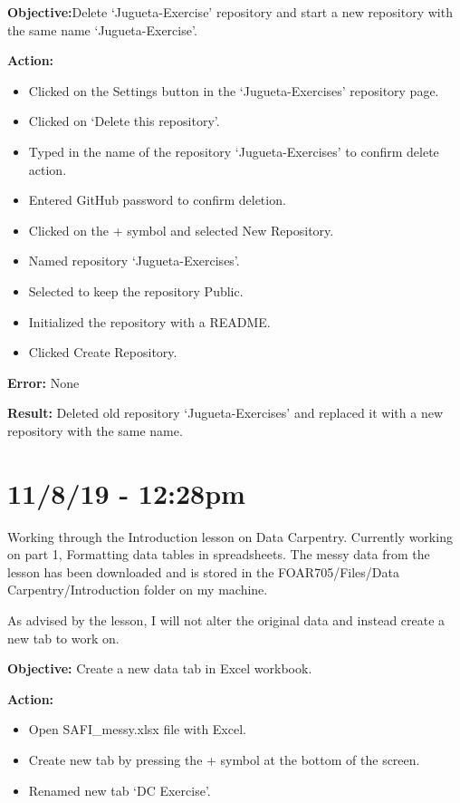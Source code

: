 \documentclass{article}
\begin{document}
\textbf{Objective:}Delete ‘Jugueta-Exercise’ repository and start a new repository with the same name ‘Jugueta-Exercise’.

\textbf{Action:}
\begin{itemize}
    \item Clicked on the Settings button in the ‘Jugueta-Exercises’ repository page. 
    \item Clicked on ‘Delete this repository’. 
    \item Typed in the name of the repository ‘Jugueta-Exercises’ to confirm delete action. 
    \item Entered GitHub password to confirm deletion.
    \item Clicked on the + symbol and selected New Repository.
    \item Named repository ‘Jugueta-Exercises’.
    \item Selected to keep the repository Public.
    \item Initialized the repository with a README.
    \item Clicked Create Repository.
\end{itemize}

\textbf{Error:} None

\textbf{Result:} Deleted old repository ‘Jugueta-Exercises’ and replaced it with a new repository with the same name.

\section*{11/8/19 - 12:28pm}

Working through the Introduction lesson on Data Carpentry. Currently working on part 1, Formatting data tables in spreadsheets. The messy data from the lesson has been downloaded and is stored in the FOAR705/Files/Data Carpentry/Introduction folder on my machine. 

As advised by the lesson, I will not alter the original data and instead create a new tab to work on.

\textbf{Objective:} Create a new data tab in Excel workbook.

\textbf{Action:}
\begin{itemize}
    \item Open SAFI\_messy.xlsx file with Excel.
    \item Create new tab by pressing the + symbol at the bottom of the screen.
    \item Renamed new tab ‘DC Exercise’.
\end{itemize}
\end{document}
